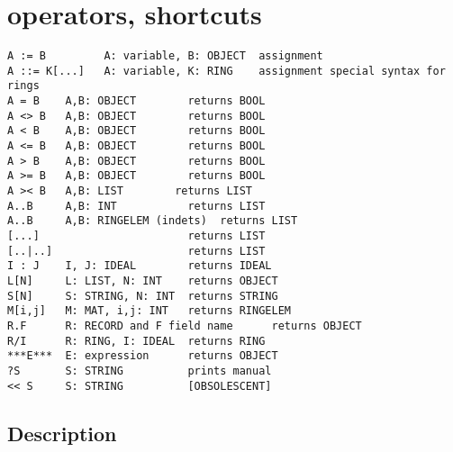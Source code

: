 \documentclass[a4paper]{mybook}
\newenvironment{command}{}{} %
\begin{document}
\section{operators, shortcuts}
\label{operators, shortcuts}
\begin{command} %


\begin{Verbatim}[label=syntax, rulecolor=\color{MidnightBlue},
frame=single]
A := B         A: variable, B: OBJECT  assignment
A ::= K[...]   A: variable, K: RING    assignment special syntax for rings
A = B    A,B: OBJECT        returns BOOL
A <> B   A,B: OBJECT        returns BOOL
A < B    A,B: OBJECT        returns BOOL
A <= B   A,B: OBJECT        returns BOOL
A > B    A,B: OBJECT        returns BOOL
A >= B   A,B: OBJECT        returns BOOL
A >< B   A,B: LIST        returns LIST
A..B     A,B: INT           returns LIST 
A..B     A,B: RINGELEM (indets)  returns LIST 
[...]                       returns LIST
[..|..]                     returns LIST
I : J    I, J: IDEAL        returns IDEAL
L[N]     L: LIST, N: INT    returns OBJECT
S[N]     S: STRING, N: INT  returns STRING
M[i,j]   M: MAT, i,j: INT   returns RINGELEM
R.F      R: RECORD and F field name      returns OBJECT
R/I      R: RING, I: IDEAL  returns RING
***E***  E: expression      returns OBJECT
?S       S: STRING          prints manual
<< S     S: STRING          [OBSOLESCENT]
\end{Verbatim}


\subsection*{Description}


\end{command}
\end{document}
